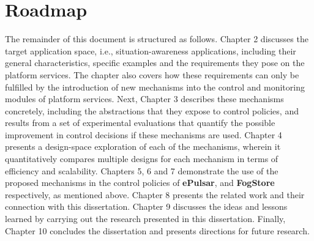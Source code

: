 \section{Roadmap}
The remainder of this document is structured as follows. Chapter 2 discusses the target application space, i.e., situation-awareness applications, including their general characteristics, specific examples and the requirements they pose on the platform services. The chapter also covers how these requirements can only be fulfilled by the introduction of new mechanisms into the control and monitoring modules of platform services. Next, Chapter 3 describes these mechanisms concretely, including the abstractions that they expose to control policies, and results from a set of experimental evaluations that quantify the possible improvement in control decisions if these mechanisms are used. Chapter 4 presents a design-space exploration of each of the mechanisms, wherein it quantitatively compares multiple designs for each mechanism in terms of efficiency and scalability. Chapters 5, 6 and 7 demonstrate the use of the proposed mechanisms in the control policies of \textbf{ePulsar}, \oneedge{} and \textbf{FogStore} respectively, as mentioned above. Chapter 8 presents the related work and their connection with this dissertation. Chapter 9 discusses the ideas and lessons learned by carrying out the research presented in this dissertation. Finally, Chapter 10 concludes the dissertation and presents directions for future research.
